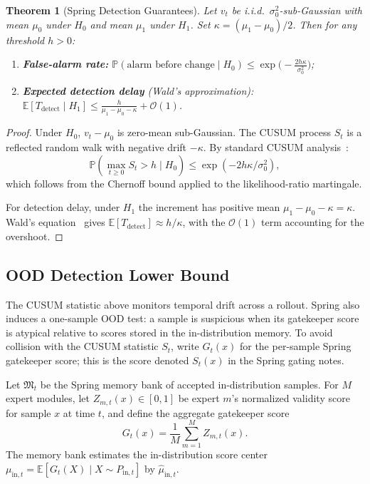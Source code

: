 \documentclass[11pt,twocolumn]{article}
\newtheorem{theorem}{Theorem}[section]
\theoremstyle{definition}
\newcommand{\E}{\mathbb{E}}
\newcommand{\Pbb}{\mathbb{P}}
\begin{document}
\begin{theorem}[Spring Detection Guarantees]
\label{thm:spring}
Let $v_t$ be i.i.d.\ $\sigma_0^2$-sub-Gaussian with mean $\mu_0$ under $H_0$
and mean $\mu_1$ under $H_1$.  Set $\kappa = (\mu_1 - \mu_0)/2$.  Then for
any threshold $h > 0$:
\begin{enumerate}[label=(\roman*),nosep]
  \item \textbf{False-alarm rate:}
    $\Pbb(\text{alarm before change} \mid H_0) \le
     \exp\bigl(-\frac{2h\kappa}{\sigma_0^2}\bigr)$;
  \item \textbf{Expected detection delay} (Wald's approximation):
    $\E[T_{\text{detect}} \mid H_1] \le
     \frac{h}{\mu_1 - \mu_0 - \kappa} + \mathcal{O}(1)$.
\end{enumerate}
\end{theorem}

\begin{proof}
Under $H_0$, $v_t - \mu_0$ is zero-mean sub-Gaussian.  The CUSUM process
$S_t$ is a reflected random walk with negative drift $-\kappa$.  By standard
CUSUM analysis~\cite{basseville1993detection,page1954continuous}:
\begin{equation}
  \Pbb(\max_{t \ge 0} S_t > h \mid H_0) \le
  \exp(-2h\kappa / \sigma_0^2),
\end{equation}
which follows from the Chernoff bound applied to the likelihood-ratio
martingale.

For detection delay, under $H_1$ the increment has positive mean
$\mu_1 - \mu_0 - \kappa = \kappa$.  Wald's equation~\cite{wald1945sequential}
gives $\E[T_{\text{detect}}] \approx h/\kappa$, with the $\mathcal{O}(1)$
term accounting for the overshoot.
\end{proof}

\subsection{OOD Detection Lower Bound}
\label{subsec:spring_ood}

The CUSUM statistic above monitors temporal drift across a rollout.  Spring
also induces a one-sample OOD test: a sample is suspicious when its gatekeeper
score is atypical relative to scores stored in the in-distribution memory.  To
avoid collision with the CUSUM statistic $S_t$, write $G_t(x)$ for the
per-sample Spring gatekeeper score; this is the score denoted $S_t(x)$ in the
Spring gating notes.

Let $\mathfrak{M}_t$ be the Spring memory bank of accepted in-distribution
samples.  For $M$ expert modules, let $Z_{m,t}(x) \in [0,1]$ be expert $m$'s
normalized validity score for sample $x$ at time $t$, and define the aggregate
gatekeeper score
\begin{equation}
  G_t(x) = \frac{1}{M}\sum_{m=1}^{M} Z_{m,t}(x).
  \label{eq:spring_gate_score}
\end{equation}
The memory bank estimates the in-distribution score center
$\mu_{\mathrm{in},t} = \E[G_t(X)\mid X \sim P_{\mathrm{in},t}]$ by
$\widehat{\mu}_{\mathrm{in},t}$.
\end{document}
